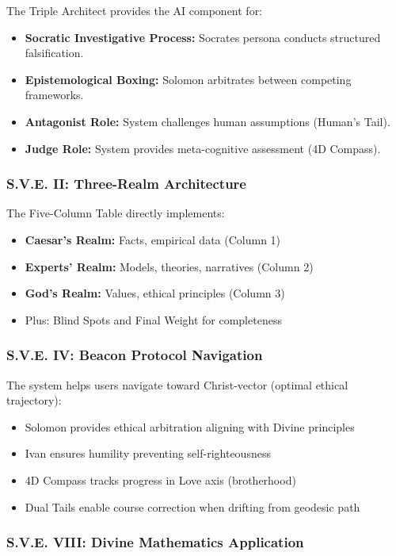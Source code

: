 \documentclass[11pt,a4paper]{article}
\theoremstyle{definition}
\theoremstyle{remark}
\begin{document}
The Triple Architect provides the AI component for:
\begin{itemize}
    \item \textbf{Socratic Investigative Process:} Socrates persona conducts structured falsification.
    \item \textbf{Epistemological Boxing:} Solomon arbitrates between competing frameworks.
    \item \textbf{Antagonist Role:} System challenges human assumptions (Human's Tail).
    \item \textbf{Judge Role:} System provides meta-cognitive assessment (4D Compass).
\end{itemize}

\subsubsection{S.V.E. II: Three-Realm Architecture}

The Five-Column Table directly implements:
\begin{itemize}
    \item \textbf{Caesar's Realm:} Facts, empirical data (Column 1)
    \item \textbf{Experts' Realm:} Models, theories, narratives (Column 2)
    \item \textbf{God's Realm:} Values, ethical principles (Column 3)
    \item Plus: Blind Spots and Final Weight for completeness
\end{itemize}

\subsubsection{S.V.E. IV: Beacon Protocol Navigation}

The system helps users navigate toward Christ-vector (optimal ethical trajectory):
\begin{itemize}
    \item Solomon provides ethical arbitration aligning with Divine principles
    \item Ivan ensures humility preventing self-righteousness
    \item 4D Compass tracks progress in Love axis (brotherhood)
    \item Dual Tails enable course correction when drifting from geodesic path
\end{itemize}

\subsubsection{S.V.E. VIII: Divine Mathematics Application}
\end{document}
